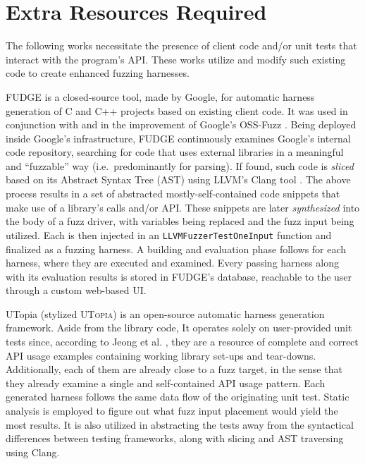\documentclass[
  a4paper,
]{scrreprt}
\theoremstyle{definition}
\theoremstyle{remark}
\begin{document}
\section{Extra Resources Required}\label{extra-resources-required}

The following works necessitate the presence of client code and/or unit
tests that interact with the program's API. These works utilize and
modify such existing code to create enhanced fuzzing harnesses.

FUDGE \autocite{fudge} is a closed-source tool, made by Google, for
automatic harness generation of C and C++ projects based on existing
client code. It was used in conjunction with and in the improvement of
Google's OSS-Fuzz \autocite{oss-fuzz}. Being deployed inside Google's
infrastructure, FUDGE continuously examines Google's internal code
repository, searching for code that uses external libraries in a
meaningful and ``fuzzable'' way (i.e.~predominantly for parsing). If
found, such code is \emph{sliced} \autocite{sasirekha2011Slicing} based
on its Abstract Syntax Tree (AST) using LLVM's Clang tool
\autocite{llvm}. The above process results in a set of abstracted
mostly-self-contained code snippets that make use of a library's calls
and/or API. These snippets are later \emph{synthesized} into the body of
a fuzz driver, with variables being replaced and the fuzz input being
utilized. Each is then injected in an \texttt{LLVMFuzzerTestOneInput}
function and finalized as a fuzzing harness. A building and evaluation
phase follows for each harness, where they are executed and examined.
Every passing harness along with its evaluation results is stored in
FUDGE's database, reachable to the user through a custom web-based UI.

UTopia \autocite{utopia} (stylized \textsc{UTopia}) is an open-source
automatic harness generation framework. Aside from the library code, It
operates solely on user-provided unit tests since, according to Jeong et
al. \autocite{utopia}, they are a resource of complete and correct API
usage examples containing working library set-ups and tear-downs.
Additionally, each of them are already close to a fuzz target, in the
sense that they already examine a single and self-contained API usage
pattern. Each generated harness follows the same data flow of the
originating unit test. Static analysis is employed to figure out what
fuzz input placement would yield the most results. It is also utilized
in abstracting the tests away from the syntactical differences between
testing frameworks, along with slicing and AST traversing using Clang.
\end{document}
